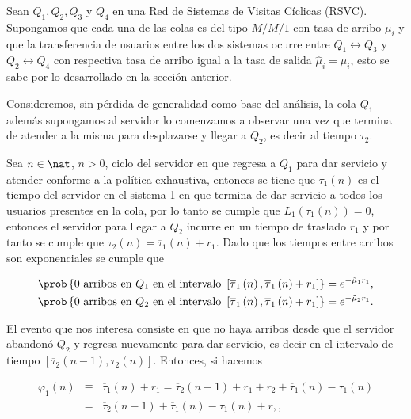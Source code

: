 Sean $Q_{1},Q_{2},Q_{3}$ y $Q_{4}$ en una Red de Sistemas de Visitas C\'iclicas (RSVC). Supongamos que cada una de las colas es del tipo $M/M/1$ con tasa de arribo $\mu_{i}$ y que la transferencia de usuarios entre los dos sistemas ocurre entre $Q_{1}\leftrightarrow Q_{3}$ y $Q_{2}\leftrightarrow Q_{4}$ con respectiva tasa de arribo igual a la tasa de salida $\hat{\mu}_{i}=\mu_{i}$, esto se sabe por lo desarrollado en la secci\'on anterior.  

Consideremos, sin p\'erdida de generalidad como base del an\'alisis, la cola $Q_{1}$ adem\'as supongamos al servidor lo comenzamos a observar una vez que termina de atender a la misma para desplazarse y llegar a $Q_{2}$, es decir al tiempo $\tau_{2}$.

Sea $n\in\nat$, $n>0$, ciclo del servidor en que regresa a $Q_{1}$ para dar servicio y atender conforme a la pol\'itica exhaustiva, entonces se tiene que $\overline{\tau}_{1}\left(n\right)$ es el tiempo del servidor en el sistema 1 en que termina de dar servicio a todos los usuarios presentes en la cola, por lo tanto se cumple que $L_{1}\left(\overline{\tau}_{1}\left(n\right)\right)=0$, entonces el servidor para llegar a $Q_{2}$ incurre en un tiempo de traslado $r_{1}$ y por tanto se cumple que $\tau_{2}\left(n\right)=\overline{\tau}_{1}\left(n\right)+r_{1}$. Dado que los tiempos entre arribos son exponenciales se cumple que 

\begin{eqnarray*}
\prob\left\{0 \textrm{ arribos en }Q_{1}\textrm{ en el intervalo }\left[\overline{\tau}_{1}\left(n\right),\overline{\tau}_{1}\left(n\right)+r_{1}\right]\right\}=e^{-\tilde{\mu}_{1}r_{1}},\\
\prob\left\{0 \textrm{ arribos en }Q_{2}\textrm{ en el intervalo }\left[\overline{\tau}_{1}\left(n\right),\overline{\tau}_{1}\left(n\right)+r_{1}\right]\right\}=e^{-\tilde{\mu}_{2}r_{1}}.
\end{eqnarray*}

El evento que nos interesa consiste en que no haya arribos desde que el servidor abandon\'o $Q_{2}$ y regresa nuevamente para dar servicio, es decir en el intervalo de tiempo $\left[\overline{\tau}_{2}\left(n-1\right),\tau_{2}\left(n\right)\right]$. Entonces, si hacemos


\begin{eqnarray*}
\varphi_{1}\left(n\right)&\equiv&\overline{\tau}_{1}\left(n\right)+r_{1}=\overline{\tau}_{2}\left(n-1\right)+r_{1}+r_{2}+\overline{\tau}_{1}\left(n\right)-\tau_{1}\left(n\right)\\
&=&\overline{\tau}_{2}\left(n-1\right)+\overline{\tau}_{1}\left(n\right)-\tau_{1}\left(n\right)+r,,
\end{eqnarray*}

